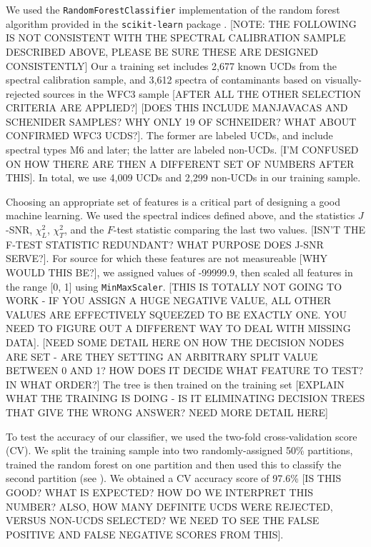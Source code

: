 \documentclass[manuscript]{aastex63}
\begin{document}
We used the \texttt{RandomForestClassifier} implementation of the random forest algorithm provided in the \texttt{scikit-learn} package \citep[IS THERE AN UPDATED REFERENCE FOR THIS?]{2012arXiv1201.0490P}. [NOTE: THE FOLLOWING IS NOT CONSISTENT WITH THE SPECTRAL CALIBRATION SAMPLE DESCRIBED ABOVE, PLEASE BE SURE THESE ARE DESIGNED CONSISTENTLY]
 Our a training set includes 2,677 known UCDs from the spectral calibration sample, and 3,612 spectra of contaminants based on visually-rejected sources in the WFC3 sample [AFTER ALL THE OTHER SELECTION CRITERIA ARE APPLIED?] [DOES THIS INCLUDE MANJAVACAS AND SCHENIDER SAMPLES? WHY ONLY 19 OF SCHNEIDER? WHAT ABOUT CONFIRMED WFC3 UCDS?]. 
 The former are labeled UCDs, and include spectral types M6 and later; the latter are labeled non-UCDs. 
 [I'M CONFUSED ON HOW THERE ARE THEN A DIFFERENT SET OF NUMBERS AFTER THIS]. In total, we use 4,009 UCDs and 2,299 non-UCDs in our training sample.
 
Choosing an appropriate set of features is a critical part of designing a good machine learning. We used the spectral indices defined above, and the statistics $J$-SNR, $\chi^2_L$, $\chi^2 _T$, and the $F$-test statistic comparing the last two values. [ISN'T THE F-TEST STATISTIC REDUNDANT? WHAT PURPOSE DOES J-SNR SERVE?]. For source for which these features are not measureable [WHY WOULD THIS BE?], we assigned values of -99999.9, then scaled all features in the range [0, 1] using \texttt{MinMaxScaler}. [THIS IS TOTALLY NOT GOING TO WORK - IF YOU ASSIGN A HUGE NEGATIVE VALUE, ALL OTHER VALUES ARE EFFECTIVELY SQUEEZED TO BE EXACTLY ONE. YOU NEED TO FIGURE OUT A DIFFERENT WAY TO DEAL WITH MISSING DATA]. [NEED SOME DETAIL HERE ON HOW THE DECISION NODES ARE SET - ARE THEY SETTING AN ARBITRARY SPLIT VALUE BETWEEN 0 AND 1? HOW DOES IT DECIDE WHAT FEATURE TO TEST? IN WHAT ORDER?] The tree is then trained on the training set [EXPLAIN WHAT THE TRAINING IS DOING - IS IT ELIMINATING DECISION TREES THAT GIVE THE WRONG ANSWER? NEED MORE DETAIL HERE]

To test the accuracy of our classifier, we used the two-fold cross-validation score (CV). We split the training sample into two randomly-assigned 50\% partitions, trained the random forest on one partition and then used this to classify the second partition (see \citealt{2017AJ....153...73M}). We obtained a CV accuracy score of 97.6\% [IS THIS GOOD? WHAT IS EXPECTED? HOW DO WE INTERPRET THIS NUMBER? ALSO, HOW MANY DEFINITE UCDS WERE REJECTED, VERSUS NON-UCDS SELECTED? WE NEED TO SEE THE FALSE POSITIVE AND FALSE NEGATIVE SCORES FROM THIS]. 
\end{document}
